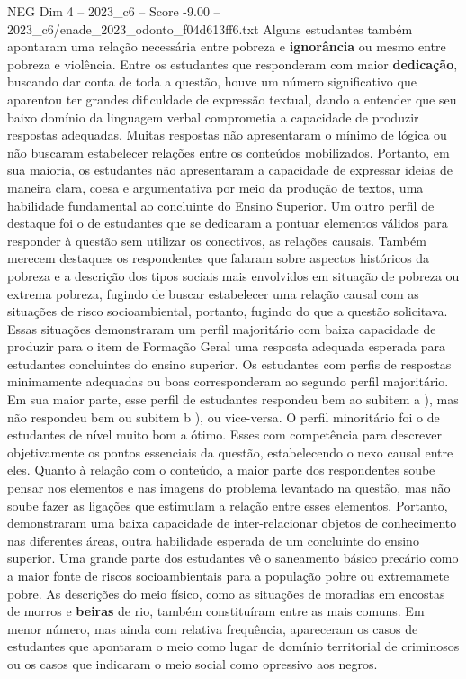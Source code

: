 \begin{textsample}{NEG Dim 4 – 2023\_c6 – Score -9.00 – 2023\_c6/enade\_2023\_odonto\_f04d613ff6.txt}
Alguns estudantes também apontaram uma relação necessária entre pobreza e \textbf{ignorância} ou mesmo entre pobreza e violência.
Entre os estudantes que responderam com maior \textbf{dedicação}, buscando dar conta de toda a questão, houve um número significativo que aparentou ter grandes dificuldade de expressão textual, dando a entender que seu baixo domínio da linguagem verbal comprometia a capacidade de produzir respostas adequadas.
Muitas respostas não apresentaram o mínimo de lógica ou não buscaram estabelecer relações entre os conteúdos mobilizados.
Portanto, em sua maioria, os estudantes não apresentaram a capacidade de expressar ideias de maneira clara, coesa e argumentativa por meio da produção de textos, uma habilidade fundamental ao concluinte do Ensino Superior.
Um outro perfil de destaque foi o de estudantes que se dedicaram a pontuar elementos válidos para responder à questão sem utilizar os conectivos, as relações causais.
Também merecem destaques os respondentes que falaram sobre aspectos históricos da pobreza e a descrição dos tipos sociais mais envolvidos em situação de pobreza ou extrema pobreza, fugindo de buscar estabelecer uma relação causal com as situações de risco socioambiental, portanto, fugindo do que a questão solicitava.
Essas situações demonstraram um perfil majoritário com baixa capacidade de produzir para o item de Formação Geral uma resposta adequada esperada para estudantes concluintes do ensino superior.
Os estudantes com perfis de respostas minimamente adequadas ou boas corresponderam ao segundo perfil majoritário.
Em sua maior parte, esse perfil de estudantes respondeu bem ao subitem a ), mas não respondeu bem ou subitem b ), ou vice-versa.
O perfil minoritário foi o de estudantes de nível muito bom a ótimo.
Esses com competência para descrever objetivamente os pontos essenciais da questão, estabelecendo o nexo causal entre eles.
Quanto à relação com o conteúdo, a maior parte dos respondentes soube pensar nos elementos e nas imagens do problema levantado na questão, mas não soube fazer as ligações que estimulam a relação entre esses elementos.
Portanto, demonstraram uma baixa capacidade de inter-relacionar objetos de conhecimento nas diferentes áreas, outra habilidade esperada de um concluinte do ensino superior.
Uma grande parte dos estudantes vê o saneamento básico precário como a maior fonte de riscos socioambientais para a população pobre ou extremamete pobre.
As descrições do meio físico, como as situações de moradias em encostas de morros e \textbf{beiras} de rio, também constituíram entre as mais comuns.
Em menor número, mas ainda com relativa frequência, apareceram os casos de estudantes que apontaram o meio como lugar de domínio territorial de criminosos ou os casos que indicaram o meio social como opressivo aos negros.

\end{textsample}
